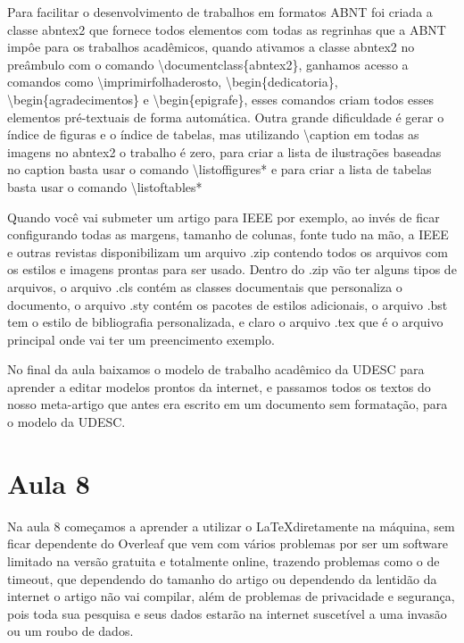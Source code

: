 Para facilitar o desenvolvimento de trabalhos em formatos ABNT foi criada a classe abntex2 que fornece todos elementos com todas as regrinhas que a ABNT impôe para os trabalhos acadêmicos, quando ativamos a classe abntex2 no preâmbulo com o comando \textbackslash documentclass\{abntex2\}, ganhamos acesso a comandos como \textbackslash imprimirfolhaderosto, \textbackslash begin\{dedicatoria\}, \textbackslash begin\{agradecimentos\} e \textbackslash begin\{epigrafe\}, esses comandos criam todos esses elementos pré-textuais de forma automática.
Outra grande dificuldade é gerar o índice de figuras e o índice de tabelas, mas utilizando \textbackslash caption em todas as imagens no abntex2 o trabalho é zero, para criar a lista de ilustrações baseadas no caption basta usar o comando \textbackslash listoffigures* e para criar a lista de tabelas basta usar o comando \textbackslash listoftables*

Quando você vai submeter um artigo para IEEE por exemplo, ao invés de ficar configurando todas as margens, tamanho de colunas, fonte tudo na mão, a IEEE e outras revistas disponibilizam um arquivo .zip contendo todos os arquivos com os estilos e imagens prontas para ser usado. Dentro do .zip vão ter alguns tipos de arquivos, o arquivo .cls contém as classes documentais que personaliza o documento, o arquivo .sty contém os pacotes de estilos adicionais, o arquivo .bst tem o estilo de bibliografia personalizada, e claro o arquivo .tex que é o arquivo principal onde vai ter um preencimento exemplo.

No final da aula baixamos o modelo de trabalho acadêmico da UDESC para aprender a editar modelos prontos da internet, e passamos todos os textos do nosso meta-artigo que antes era escrito em um documento sem formatação, para o modelo da UDESC. 



\section{Aula 8}

Na aula 8 começamos a aprender a utilizar o \LaTeX diretamente na máquina, sem ficar dependente do Overleaf que vem com vários problemas por ser um software limitado na versão gratuita e totalmente online, trazendo problemas como o de timeout, que dependendo do tamanho do artigo ou dependendo da lentidão da internet o artigo não vai compilar, além de problemas de privacidade e segurança, pois toda sua pesquisa e seus dados estarão na internet suscetível a uma invasão ou um roubo de dados.

